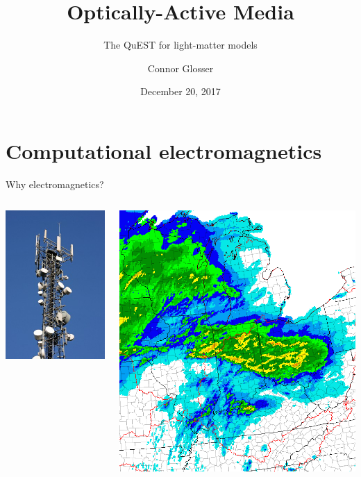 \documentclass[aspectratio=169, usenames, dvipsnames]{beamer}
\title{Optically-Active Media}
\subtitle{The QuEST for light-matter models}
\date{December 20, 2017}
\author{Connor Glosser}
\institute{Michigan State University, Physics \& Electrical Engineering}
\begin{document}
\maketitle

\section{Computational electromagnetics}

\begin{frame}{Why electromagnetics?}
  \begin{columns}
      \centering
      \includegraphics[height=0.7\textheight]{figures/cell_phone}

      \centering
      \includegraphics[width=\textwidth]{figures/weather_radar}


\end{columns}
\end{frame}
\end{document}
